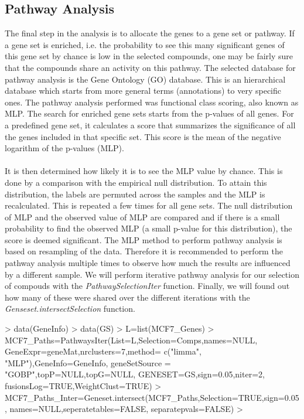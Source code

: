 \documentclass[a4paper]{article}
\begin{document}
\subsection{Pathway Analysis}
The final step in the analysis is to allocate the genes to a gene set or
pathway. If a gene set is enriched, i.e. the probability to see this many
significant genes of this gene set by chance is low in the selected compounds,
one may be fairly sure that the compounds share an activity on this pathway.
The selected database for pathway analysis is the Gene Ontology (GO) database.
This is an hierarchical database which starts from more general terms
(annotations) to very specific ones. The pathway analysis performed was
functional class scoring, also known as MLP. The search for enriched gene sets
starts from the p-values of all genes. For a predefined gene set, it calculates
a score that summarizes the significance of all the genes included in that
specific set. This score is the mean of the negative logarithm of the p-values
(MLP).\\ \\
It is then determined how likely it is to see the MLP value by chance. This is
done by a comparison with the empirical null distribution. To attain this
distribution, the labels are permuted across the samples and the MLP is
recalculated. This is repeated a few times for all gene sets. The null
distribution of MLP and the observed value of MLP are compared and if there is a
small probability to find the observed MLP (a small p-value for this
distribution), the score is deemed significant. The MLP method to perform
pathway analysis is based on resampling of the data. Therefore it is recommended
to perform the pathway analysis multiple times to observe how much the results
are influenced by a different sample. We will perform iterative pathway analysis
for our selection of compouds with the {\it PathwaySelectionIter} function.
Finally, we will found out how many of these were shared over the different
iterations with the {\it Genseset.intersectSelection} function.
\begin{Schunk}
\begin{Sinput}
> data(GeneInfo)
> data(GS)
> L=list(MCF7_Genes)
> MCF7_Paths=PathwaysIter(List=L,Selection=Comps,names=NULL,
                         GeneExpr=geneMat,nrclusters=7,method=
                         c("limma", "MLP"),GeneInfo=GeneInfo,
                         geneSetSource = "GOBP",topP=NULL,topG=NULL,
                         GENESET=GS,sign=0.05,niter=2,
                         fusionsLog=TRUE,WeightClust=TRUE)
> MCF7_Paths_Inter=Geneset.intersect(MCF7_Paths,Selection=TRUE,sign=0.05,
                                    names=NULL,seperatetables=FALSE,
                                    separatepvals=FALSE)
> 
\end{Sinput}
\end{Schunk}
\newpage
\end{document}

